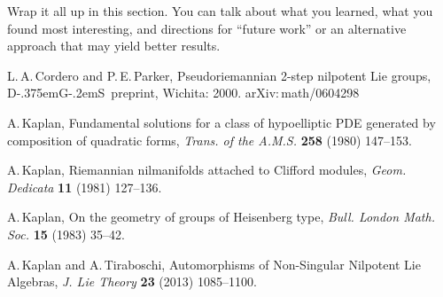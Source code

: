 \documentclass[11 pt]{article}
\newcommand{\DGS}{D{\kern-.375em}G{\kern-.2em}S}
\begin{document}
Wrap it all up in this section. You can talk about what you learned, what
you found most interesting, and directions for ``future work'' or an
alternative approach that may yield better results.

\begin{thebibliography}{99}
L.\,A.\,Cordero and P.\,E.\,Parker, Pseudoriemannian 2-step
nilpotent Lie groups, \DGS\ preprint, Wichita: 2000.
{\sf arXiv:\,math/0604298}

A.\,Kaplan, Fundamental solutions for a class of hypoelliptic PDE
generated by composition of quadratic forms, {\it Trans. of the A.M.S.}
{\bf 258}
(1980) 147--153.

A.\,Kaplan, Riemannian nilmanifolds attached to Clifford modules,
{\it Geom. Dedicata} {\bf 11} (1981) 127--136.

A.\,Kaplan, On the geometry of groups of Heisenberg type, {\it Bull.
London Math. Soc.} {\bf 15} (1983) 35--42.

A.\,Kaplan and A.\,Tiraboschi, Automorphisms of Non-Singular
Nilpotent Lie Algebras, {\it J. Lie Theory} {\bf 23} (2013) 1085--1100.
\end{thebibliography}
\end{document}
